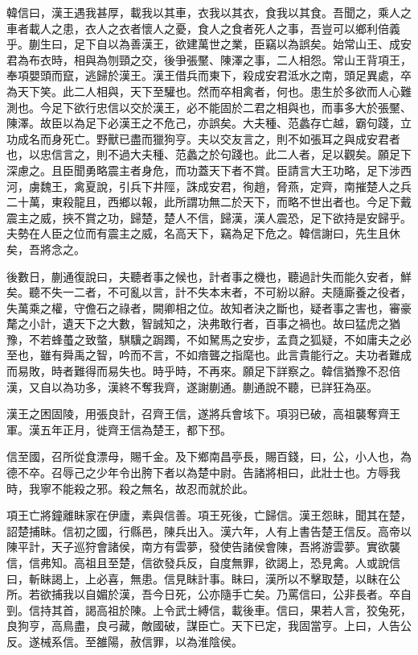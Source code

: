 韓信曰，漢王遇我甚厚，載我以其車，衣我以其衣，食我以其食。吾聞之，乘人之車者載人之患，衣人之衣者懷人之憂，食人之食者死人之事，吾豈可以鄉利倍義乎。蒯生曰，足下自以為善漢王，欲建萬世之業，臣竊以為誤矣。始常山王、成安君為布衣時，相與為刎頸之交，後爭張黶、陳澤之事，二人相怨。常山王背項王，奉項嬰頭而竄，逃歸於漢王。漢王借兵而東下，殺成安君泜水之南，頭足異處，卒為天下笑。此二人相與，天下至驩也。然而卒相禽者，何也。患生於多欲而人心難測也。今足下欲行忠信以交於漢王，必不能固於二君之相與也，而事多大於張黶、陳澤。故臣以為足下必漢王之不危己，亦誤矣。大夫種、范蠡存亡越，霸句踐，立功成名而身死亡。野獸已盡而獵狗亨。夫以交友言之，則不如張耳之與成安君者也，以忠信言之，則不過大夫種、范蠡之於句踐也。此二人者，足以觀矣。願足下深慮之。且臣聞勇略震主者身危，而功蓋天下者不賞。臣請言大王功略，足下涉西河，虜魏王，禽夏說，引兵下井陘，誅成安君，徇趙，脅燕，定齊，南摧楚人之兵二十萬，東殺龍且，西鄉以報，此所謂功無二於天下，而略不世出者也。今足下戴震主之威，挾不賞之功，歸楚，楚人不信，歸漢，漢人震恐，足下欲持是安歸乎。夫勢在人臣之位而有震主之威，名高天下，竊為足下危之。韓信謝曰，先生且休矣，吾將念之。

後數日，蒯通復說曰，夫聽者事之候也，計者事之機也，聽過計失而能久安者，鮮矣。聽不失一二者，不可亂以言，計不失本末者，不可紛以辭。夫隨廝養之役者，失萬乘之權，守儋石之祿者，闕卿相之位。故知者決之斷也，疑者事之害也，審豪氂之小計，遺天下之大數，智誠知之，決弗敢行者，百事之禍也。故曰猛虎之猶豫，不若蜂蠆之致螫，騏驥之跼躅，不如駑馬之安步，孟賁之狐疑，不如庸夫之必至也，雖有舜禹之智，吟而不言，不如瘖聾之指麾也。此言貴能行之。夫功者難成而易敗，時者難得而易失也。時乎時，不再來。願足下詳察之。韓信猶豫不忍倍漢，又自以為功多，漢終不奪我齊，遂謝蒯通。蒯通說不聽，已詳狂為巫。

漢王之困固陵，用張良計，召齊王信，遂將兵會垓下。項羽已破，高祖襲奪齊王軍。漢五年正月，徙齊王信為楚王，都下邳。

信至國，召所從食漂母，賜千金。及下鄉南昌亭長，賜百錢，曰，公，小人也，為德不卒。召辱己之少年令出胯下者以為楚中尉。告諸將相曰，此壯士也。方辱我時，我寧不能殺之邪。殺之無名，故忍而就於此。

項王亡將鐘離眛家在伊廬，素與信善。項王死後，亡歸信。漢王怨眛，聞其在楚，詔楚捕眛。信初之國，行縣邑，陳兵出入。漢六年，人有上書告楚王信反。高帝以陳平計，天子巡狩會諸侯，南方有雲夢，發使告諸侯會陳，吾將游雲夢。實欲襲信，信弗知。高祖且至楚，信欲發兵反，自度無罪，欲謁上，恐見禽。人或說信曰，斬眛謁上，上必喜，無患。信見眛計事。眛曰，漢所以不擊取楚，以眛在公所。若欲捕我以自媚於漢，吾今日死，公亦隨手亡矣。乃罵信曰，公非長者。卒自剄。信持其首，謁高祖於陳。上令武士縛信，載後車。信曰，果若人言，狡兔死，良狗亨，高鳥盡，良弓藏，敵國破，謀臣亡。天下已定，我固當亨。上曰，人告公反。遂械系信。至雒陽，赦信罪，以為淮陰侯。

